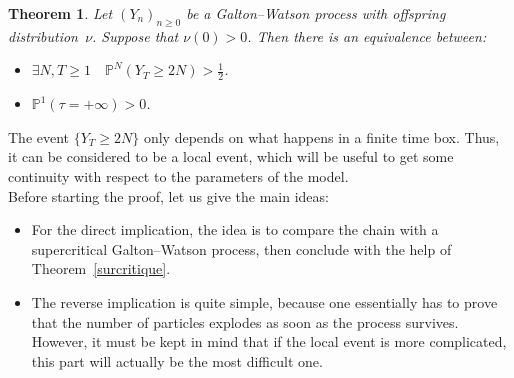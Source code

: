 \documentclass[svgnames]{amsart}
\renewcommand{\P}{\ensuremath{\mathbb{P}}}
\newcommand{\1}{\mathbbo{1}}
\newtheorem{theo}{Theorem}
\begin{document}
\begin{theo}
\label{equivalence}
Let $(Y_n)_{n\ge 0}$ be a  Galton--Watson process with offspring distribution~$\nu$.
Suppose that $\nu(0)>0$. Then there is an equivalence between:
\begin{itemize}
\item $\exists N,T\ge 1\quad \P^N(Y_T\ge 2N)>\frac12$.
\item $\P^1(\tau=+\infty)>0$.
\end{itemize}
\end{theo}

The event $\{Y_T\ge 2N\}$ only depends on what happens in a finite time box. Thus, it can be considered to be a local event, which will be useful to get some continuity with respect to the parameters of the model. \\

Before starting the proof, let us give the main ideas:
\begin{itemize}
\item For the direct implication, the idea is to compare the chain with a supercritical  Galton--Watson process, then conclude with the help of Theorem~\ref{surcritique}.
\item The reverse implication is quite simple, because one essentially has to prove that the number of particles explodes as soon as the process survives.
  However, it must be kept in mind that if the local event is more complicated, this part will actually be the most difficult one.
\end{itemize}
\end{document}
